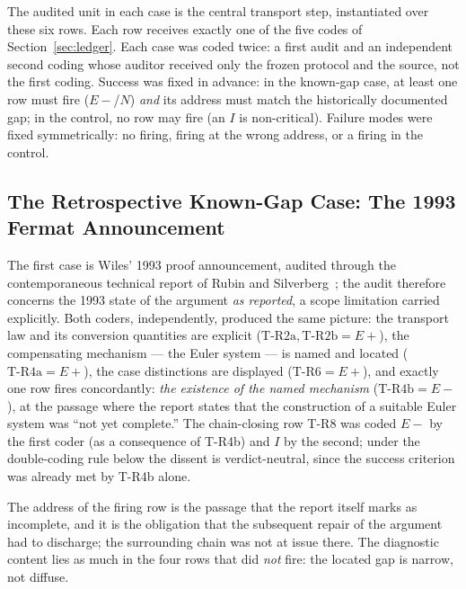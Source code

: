 \documentclass[11pt,a4paper]{article}
\begin{document}
The audited unit in each case is the central transport step, instantiated over
these six rows. Each row receives exactly one of the five codes of
Section~\ref{sec:ledger}. Each case was coded twice: a first audit and an
independent second coding whose auditor received only the frozen protocol and
the source, not the first coding. Success was fixed in advance: in the
known-gap case, at least one row must fire ($E{-}$/$N$) \emph{and} its address
must match the historically documented gap; in the control, no row may fire (an
$I$ is non-critical). Failure modes were fixed symmetrically: no firing, firing
at the wrong address, or a firing in the control.

\subsection{The Retrospective Known-Gap Case: The 1993 Fermat Announcement}

The first case is Wiles' 1993 proof announcement, audited through the
contemporaneous technical report of Rubin and
Silverberg~\cite{rubinsilverberg}; the audit therefore concerns the 1993
state of the argument \emph{as reported}, a scope limitation carried
explicitly. Both coders, independently, produced the same picture: the
transport law and its conversion quantities are explicit
($\text{T-R2a}, \text{T-R2b} = E{+}$), the compensating mechanism --- the Euler
system --- is named and located ($\text{T-R4a} = E{+}$), the case distinctions
are displayed ($\text{T-R6} = E{+}$), and exactly one row fires concordantly:
\emph{the existence of the named mechanism} ($\text{T-R4b} = E{-}$), at the
passage where the report states that the construction of a suitable Euler
system was ``not yet complete.'' The chain-closing row T-R8 was coded $E{-}$ by
the first coder (as a consequence of T-R4b) and $I$ by the second; under the
double-coding rule below the dissent is verdict-neutral, since the success
criterion was already met by T-R4b alone.

The address of the firing row is the passage that the report itself marks as
incomplete, and it is the obligation that the subsequent repair of the argument
had to discharge; the surrounding chain was not at issue there. The diagnostic
content lies as much in the four rows that did \emph{not} fire: the located gap
is narrow, not diffuse.
\end{document}
